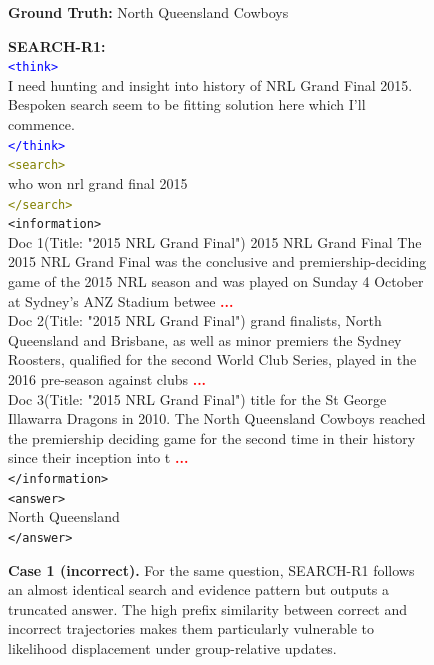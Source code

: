 \begin{figure}[t]
\centering
\begin{tcolorbox}[
  colback=white,
  colframe=black!60,
  title=\textbf{Question:} Who won the NRL grand final in 2015?
]
\textbf{Ground Truth:} North Queensland Cowboys

\vspace{0.5em}
\textbf{SEARCH-R1:}\\
\textcolor{blue}{\texttt{<think>}}\\
I need hunting and insight into history of NRL Grand Final 2015. Bespoken search seem to be fitting solution here which I'll commence.\\
\textcolor{blue}{\texttt{</think>}}\\[0.7em]
\textcolor{olive}{\texttt{<search>}}\\
who won nrl grand final 2015\\
\textcolor{olive}{\texttt{</search>}}\\[0.7em]
\textcolor{teal!60!black}{\texttt{<information>}}\\
Doc 1(Title: "2015 NRL Grand Final") 2015 NRL Grand Final The 2015 NRL Grand Final was the conclusive and premiership-deciding game of the 2015 NRL season and was played on Sunday 4 October at Sydney's ANZ Stadium betwee \textcolor{red}{\textbf{...}} \\
Doc 2(Title: "2015 NRL Grand Final") grand finalists, North Queensland and Brisbane, as well as minor premiers the Sydney Roosters, qualified for the second World Club Series, played in the 2016 pre-season against clubs \textcolor{red}{\textbf{...}} \\
Doc 3(Title: "2015 NRL Grand Final") title for the St George Illawarra Dragons in 2010. The North Queensland Cowboys reached the premiership deciding game for the second time in their history since their inception into t \textcolor{red}{\textbf{...}}\\
\textcolor{teal!60!black}{\texttt{</information>}}\\[0.7em]
\textcolor{magenta!70!black}{\texttt{<answer>}}\\
North Queensland\\
\textcolor{magenta!70!black}{\texttt{</answer>}}\\[0.7em]
\end{tcolorbox}
\caption{\textbf{Case 1 (incorrect).} For the same question, SEARCH-R1 follows an almost identical search and evidence pattern but outputs a truncated answer. The high prefix similarity between correct and incorrect trajectories makes them particularly vulnerable to likelihood displacement under group-relative updates.}
\label{fig:nrl-incorrect}
\end{figure}


